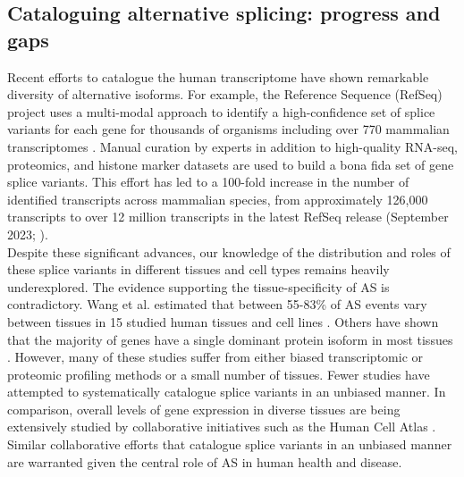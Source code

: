 \subsection{Cataloguing alternative splicing: progress and gaps}
Recent efforts to catalogue the human transcriptome have shown remarkable diversity of alternative isoforms. For example, the Reference Sequence (RefSeq) project uses a multi-modal approach to identify a high-confidence set of splice variants for each gene for thousands of organisms including over 770 mammalian transcriptomes \cite{OLeary2016-ci}. Manual curation by experts in addition to high-quality RNA-seq, proteomics, and histone marker datasets are used to build a bona fida set of gene splice variants. This effort has led to a 100-fold increase in the number of identified transcripts across mammalian species, from approximately 126,000 transcripts to over 12 million transcripts in the latest RefSeq release (September 2023; \cite{refseq_ftp}). \\

Despite these significant advances, our knowledge of the distribution and roles of these splice variants in different tissues and cell types remains heavily underexplored. The evidence supporting the tissue-specificity of AS is contradictory. Wang et al. estimated that between 55-83\% of AS events vary between tissues in 15 studied human tissues and cell lines \cite{Wang2008-yg}. Others have shown that the majority of genes have a single dominant protein isoform in most tissues \cite{Ezkurdia2015-iv,Gonzalez-Porta2013-il}. However, many of these studies suffer from either biased transcriptomic or proteomic profiling methods or a small number of tissues. Fewer studies have attempted to systematically catalogue splice variants in an unbiased manner. In comparison, overall levels of gene expression in diverse tissues are being extensively studied by collaborative initiatives such as the Human Cell Atlas \cite{hca_resources}. Similar collaborative efforts that catalogue splice variants in an unbiased manner are warranted given the central role of AS in human health and disease.

